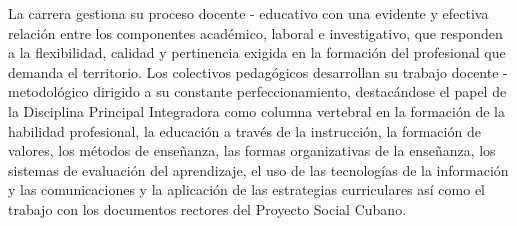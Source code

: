 La carrera gestiona su proceso docente - educativo con una evidente y efectiva relación entre los componentes académico, laboral e investigativo, que responden a la flexibilidad, calidad y pertinencia exigida en la formación del profesional que demanda el territorio. Los colectivos pedagógicos desarrollan su trabajo docente - metodológico dirigido a su constante perfeccionamiento, destacándose el papel de la Disciplina Principal Integradora como columna vertebral en la formación de la habilidad profesional, la educación a través de la instrucción, la formación de valores, los métodos de enseñanza, las formas organizativas de la enseñanza, los sistemas de evaluación del aprendizaje, el uso de las tecnologías de la información y las comunicaciones y la aplicación de las estrategias curriculares así como el trabajo con los documentos rectores del Proyecto Social Cubano.